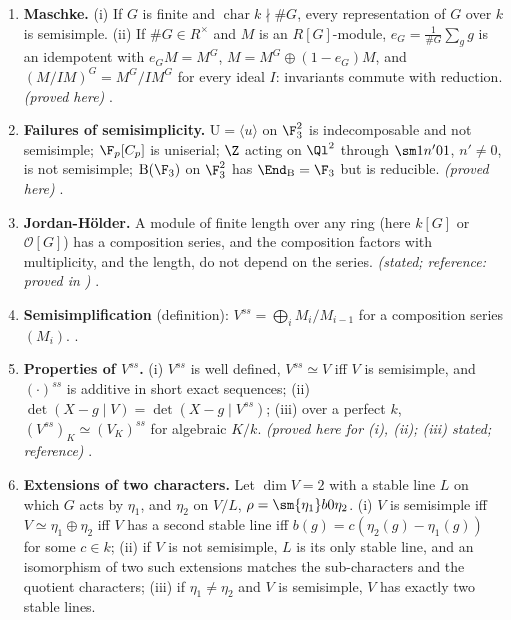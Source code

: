 \begin{enumerate}[label=\textbf{\thechapter.\arabic*}]
iff every subrepresentation has a stable complement; subrepresentations and quotients of semisimple representations are
semisimple; $V=\bigoplus_SV_S$ with $V_S\simeq S^{m_S}$, and $m_S=\dim\Hom_G(S,V)$ if $S$ is absolutely irreducible. \emph{(proved here)}
.
\item \textbf{Maschke.} (i) If $G$ is finite and $\operatorname{char}k\nmid\#G$, every representation of $G$ over $k$ is semisimple.
(ii) If $\#G\in R^\times$ and $M$ is an $R[G]$-module, $e_G=\frac1{\#G}\sum_gg$ is an idempotent with $e_GM=M^G$, $M=M^G\oplus(1-e_G)M$,
and $(M/IM)^G=M^G/IM^G$ for every ideal $I$: invariants commute with reduction. \emph{(proved here)} .
\item \textbf{Failures of semisimplicity.} $\mathrm U=\langle u\rangle$ on $\F_3^2$ is indecomposable and not semisimple; $\F_p[C_p]$ is
uniserial; $\Z$ acting on $\Ql^2$ through $\sm1{n'}01$, $n'\ne0$, is not semisimple; $\mathrm B(\F_3)$ on $\F_3^2$ has $\End_{\mathrm B}=\F_3$ but is
reducible. \emph{(proved here)} .
\item \textbf{Jordan-H\"older.} A module of finite length over any ring (here $k[G]$ or $\mathcal{O}[G]$) has a composition series, and the
composition factors with multiplicity, and the length, do not depend on the series. \emph{(stated; reference: proved in
)} .
\item \textbf{Semisimplification} (definition): $V^{ss}=\bigoplus_iM_i/M_{i-1}$ for a composition series $(M_i)$.
.
\item \textbf{Properties of $V^{ss}$.} (i) $V^{ss}$ is well defined, $V^{ss}\simeq V$ iff $V$ is semisimple, and $(\cdot)^{ss}$ is additive in
short exact sequences; (ii) $\det(X-g\mid V)=\det(X-g\mid V^{ss})$; (iii) over a perfect $k$, $(V^{ss})_K\simeq(V_K)^{ss}$ for algebraic $K/k$.
\emph{(proved here for (i), (ii); (iii) stated; reference)} .
\item \textbf{Extensions of two characters.} Let $\dim V=2$ with a stable line $L$ on which $G$ acts by $\eta_1$, and $\eta_2$ on $V/L$,
$\rho=\sm{\eta_1}b0{\eta_2}$. (i) $V$ is semisimple iff $V\simeq\eta_1\oplus\eta_2$ iff $V$ has a second stable line iff $b(g)=c(\eta_2(g)-\eta_1(g))$
for some $c\in k$; (ii) if $V$ is not semisimple, $L$ is its only stable line, and an isomorphism of two such extensions matches
the sub-characters and the quotient characters; (iii) if $\eta_1\ne\eta_2$ and $V$ is semisimple, $V$ has exactly two stable lines.

\end{enumerate}
